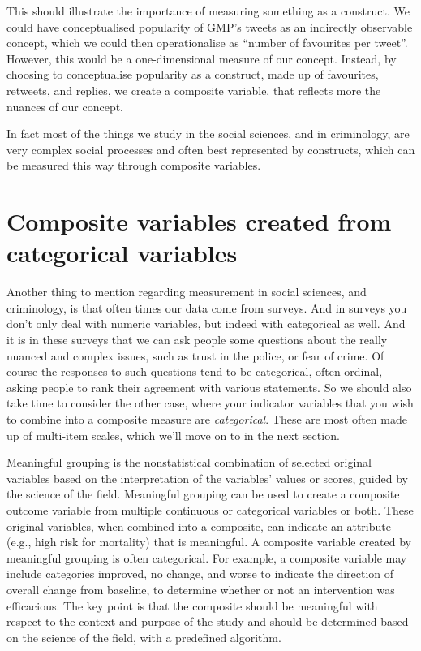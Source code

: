 \documentclass[]{book}
\theoremstyle{definition}
\theoremstyle{definition}
\theoremstyle{definition}
\theoremstyle{remark}
\begin{document}
This should illustrate the importance of measuring something as a
construct. We could have conceptualised popularity of GMP's tweets as an
indirectly observable concept, which we could then operationalise as
``number of favourites per tweet''. However, this would be a
one-dimensional measure of our concept. Instead, by choosing to
conceptualise popularity as a construct, made up of favourites,
retweets, and replies, we create a composite variable, that reflects
more the nuances of our concept.

In fact most of the things we study in the social sciences, and in
criminology, are very complex social processes and often best
represented by constructs, which can be measured this way through
composite variables.

\hypertarget{composite-variables-created-from-categorical-variables}{%
\section{Composite variables created from categorical
variables}\label{composite-variables-created-from-categorical-variables}}

Another thing to mention regarding measurement in social sciences, and
criminology, is that often times our data come from surveys. And in
surveys you don't only deal with numeric variables, but indeed with
categorical as well. And it is in these surveys that we can ask people
some questions about the really nuanced and complex issues, such as
trust in the police, or fear of crime. Of course the responses to such
questions tend to be categorical, often ordinal, asking people to rank
their agreement with various statements. So we should also take time to
consider the other case, where your indicator variables that you wish to
combine into a composite measure are \emph{categorical}. These are most
often made up of multi-item scales, which we'll move on to in the next
section.

Meaningful grouping is the nonstatistical combination of selected
original variables based on the interpretation of the variables' values
or scores, guided by the science of the field. Meaningful grouping can
be used to create a composite outcome variable from multiple continuous
or categorical variables or both. These original variables, when
combined into a composite, can indicate an attribute (e.g., high risk
for mortality) that is meaningful. A composite variable created by
meaningful grouping is often categorical. For example, a composite
variable may include categories improved, no change, and worse to
indicate the direction of overall change from baseline, to determine
whether or not an intervention was efficacious. The key point is that
the composite should be meaningful with respect to the context and
purpose of the study and should be determined based on the science of
the field, with a predefined algorithm.
\end{document}
